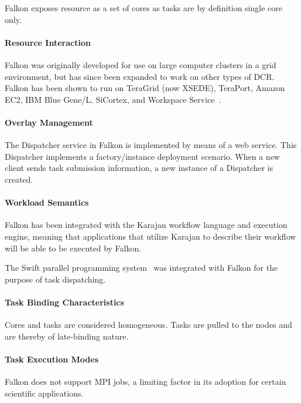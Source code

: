 \documentclass{sig-alternate}
\begin{document}
Falkon exposes resource as a set of cores as tasks are by definition single
core only.

\paragraph{Resource Interaction}

Falkon was originally developed for use on large computer clusters in a grid
environment, but has since been expanded to work on other types of
DCR. Falkon has been shown to run on TeraGrid (now XSEDE),
TeraPort, Amazon EC2, IBM Blue Gene/L, SiCortex, and Workspace
Service~\cite{1362680}.

\paragraph{Overlay Management}

The Dispatcher service in Falkon is implemented by means of a web service.
This Dispatcher implements a factory/instance deployment scenario.
When a new client sends task submission information, a new instance
of a Dispatcher is created.

\paragraph{Workload Semantics}

Falkon has been integrated with the Karajan workflow language and execution
engine, meaning that applications that utilize Karajan to describe their
workflow will be able to be executed by Falkon.

The Swift parallel programming system~\cite{Wilde2011} was integrated
with Falkon for the purpose of task dispatching.

\paragraph{Task Binding Characteristics}

Cores and tasks are considered homogeneous. Tasks are pulled to the nodes
and are thereby of late-binding nature.

\paragraph{Task Execution Modes}

Falkon does not support MPI jobs, a limiting factor in its adoption for certain
scientific applications.
\end{document}
